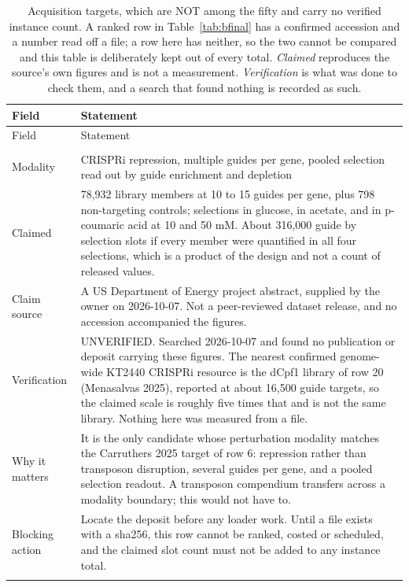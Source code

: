 \begingroup
\footnotesize
\begin{longtable}{@{}L{30mm} L{140mm}@{}}
\caption[]{Acquisition targets, which are NOT among the fifty and carry no verified
instance count. A ranked row in Table~\ref{tab:bfinal} has a confirmed accession and a
number read off a file; a row here has neither, so the two cannot be compared and this
table is deliberately kept out of every total. \emph{Claimed} reproduces the source's
own figures and is not a measurement. \emph{Verification} is what was done to check
them, and a search that found nothing is recorded as such.}
\label{tab:bacquisition}\\
\toprule
Field & Statement \\
\midrule
\endfirsthead
\toprule
Field & Statement \\
\midrule
\endhead
\bottomrule
\endfoot
{} \\
\addlinespace[3pt]
Modality & CRISPRi repression, multiple guides per gene, pooled selection read out by guide enrichment and depletion \\
Claimed & 78,932 library members at 10 to 15 guides per gene, plus 798 non-targeting controls; selections in glucose, in acetate, and in p-coumaric acid at 10 and 50 mM. About 316,000 guide by selection slots if every member were quantified in all four selections, which is a product of the design and not a count of released values. \\
Claim source & A US Department of Energy project abstract, supplied by the owner on 2026-10-07. Not a peer-reviewed dataset release, and no accession accompanied the figures. \\
Verification & UNVERIFIED. Searched 2026-10-07 and found no publication or deposit carrying these figures. The nearest confirmed genome-wide KT2440 CRISPRi resource is the dCpf1 library of row 20 (Menasalvas 2025), reported at about 16,500 guide targets, so the claimed scale is roughly five times that and is not the same library. Nothing here was measured from a file. \\
Why it matters & It is the only candidate whose perturbation modality matches the Carruthers 2025 target of row 6: repression rather than transposon disruption, several guides per gene, and a pooled selection readout. A transposon compendium transfers across a modality boundary; this would not have to. \\
Blocking action & Locate the deposit before any loader work. Until a file exists with a sha256, this row cannot be ranked, costed or scheduled, and the claimed slot count must not be added to any instance total. \\
\addlinespace[6pt]
\end{longtable}
\endgroup

